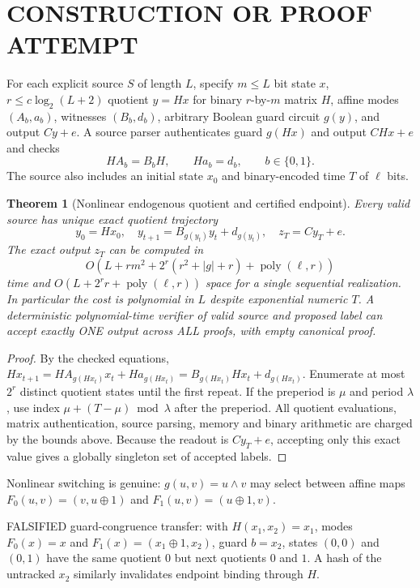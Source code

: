 \documentclass[11pt]{article}
\newtheorem{theorem}{Theorem}
\begin{document}
\section{CONSTRUCTION OR PROOF ATTEMPT}
For each explicit source $S$ of length $L$, specify $m\le L$ bit state $x$, $r\le c\log_2(L+2)$ quotient $y=Hx$ for binary $r$-by-$m$ matrix $H$, affine modes $(A_b,a_b)$, witnesses $(B_b,d_b)$, arbitrary Boolean guard circuit $g(y)$, and output $Cy+e$. A source parser authenticates guard $g(Hx)$ and output $CHx+e$ and checks
\[HA_b=B_bH,\qquad Ha_b=d_b,\qquad b\in\{0,1\}.\]
The source also includes an initial state $x_0$ and binary-encoded time $T$ of $\ell$ bits.

\begin{theorem}[Nonlinear endogenous quotient and certified endpoint]
Every valid source has unique exact quotient trajectory
\[y_0=Hx_0,\quad y_{t+1}=B_{g(y_t)}y_t+d_{g(y_t)},\quad z_T=Cy_T+e.\]
The exact output $z_T$ can be computed in
\[O(L+rm^2+2^r(r^2+|g|+r)+\operatorname{poly}(\ell,r))\]
time and $O(L+2^r r+\operatorname{poly}(\ell,r))$ space for a single sequential realization. In particular the cost is polynomial in $L$ despite exponential numeric $T$. A deterministic polynomial-time verifier of valid source and proposed label can accept exactly ONE output across ALL proofs, with empty canonical proof.
\end{theorem}
\begin{proof}
By the checked equations, $Hx_{t+1}=HA_{g(Hx_t)}x_t+Ha_{g(Hx_t)}=B_{g(Hx_t)}Hx_t+d_{g(Hx_t)}$. Enumerate at most $2^r$ distinct quotient states until the first repeat. If the preperiod is $\mu$ and period $\lambda$, use index $\mu+(T-\mu)\bmod\lambda$ after the preperiod. All quotient evaluations, matrix authentication, source parsing, memory and binary arithmetic are charged by the bounds above. Because the readout is $Cy_T+e$, accepting only this exact value gives a globally singleton set of accepted labels.
\end{proof}
Nonlinear switching is genuine: $g(u,v)=u\wedge v$ may select between affine maps $F_0(u,v)=(v,u\oplus1)$ and $F_1(u,v)=(u\oplus1,v)$.

\noindent FALSIFIED guard-congruence transfer: with $H(x_1,x_2)=x_1$, modes $F_0(x)=x$ and $F_1(x)=(x_1\oplus1,x_2)$, guard $b=x_2$, states $(0,0)$ and $(0,1)$ have the same quotient $0$ but next quotients $0$ and $1$. A hash of the untracked $x_2$ similarly invalidates endpoint binding through $H$.
\end{document}
